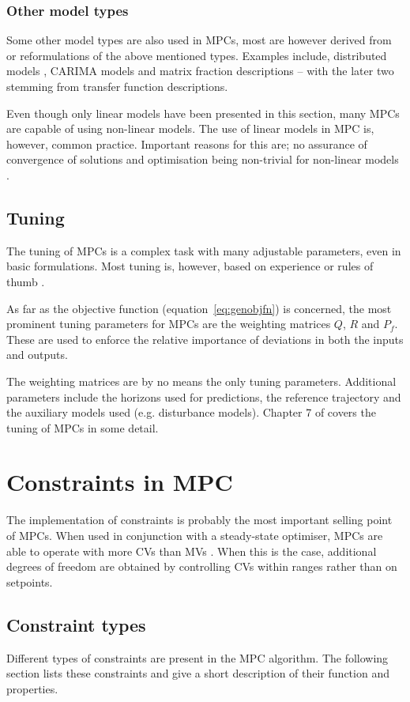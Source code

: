 \subsubsection{Other model types}
Some other model types are also used in MPCs, most are however derived from or reformulations of the above mentioned types.
Examples include, distributed models \citep[4]{rawlings}, CARIMA models and matrix fraction descriptions \citep[24,28]{rossiter} -- with the later two stemming from transfer function descriptions.

Even though only linear models have been presented in this section, many MPCs are capable of using non-linear models.
The use of linear models in MPC is, however, common practice.
Important reasons for this are; no assurance of convergence of solutions and optimisation being non-trivial for non-linear models \citep[17]{rossiter}.

\subsection{Tuning}
The tuning of MPCs is a complex task with many adjustable parameters, even in basic formulations.
Most tuning is, however, based on experience or rules of thumb \citep[188]{maciejowskimpc}.

As far as the objective function (equation~\ref{eq:genobjfn}) is concerned, the most prominent tuning parameters for MPCs are the weighting matrices $Q$, $R$ and $P_f$. 
These are used to enforce the relative importance of deviations in both the inputs and outputs.

The weighting matrices are by no means the only tuning parameters.
Additional parameters include the horizons used for predictions, the reference trajectory and the auxiliary models used (e.g. disturbance models). 
Chapter 7 of \citet{maciejowskimpc} covers the tuning of MPCs in some detail.

\section{Constraints in MPC}
The implementation of constraints is probably the most important selling point of MPCs.
When used in conjunction with a steady-state optimiser, MPCs are able to operate with more CVs than MVs \citep{vinsonphd}. 
When this is the case, additional degrees of freedom are obtained by controlling CVs within ranges rather than on setpoints.

\subsection{Constraint types}
Different types of constraints are present in the MPC algorithm.
The following section lists these constraints and give a short description of their function and properties.
